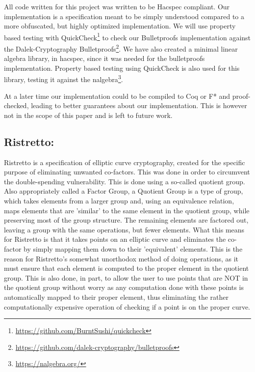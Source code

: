 \documentclass{article}
\begin{document}
All code written for this project was written to be Hacspec
compliant.  Our implementation is a specification meant to
be simply understood compared to a more obfuscated, but highly
optimized implementation. We will use property based testing with
QuickCheck\footnote{\url{https://github.com/BurntSushi/quickcheck}}
to check our Bulletproofs implementation against the Dalek-Cryptography
Bulletproofs\footnote{\url{https://github.com/dalek-cryptography/bulletproofs}}.
We have also created a minimal linear algebra library, in hacspec,
since it was needed for the bulletproofs implementation. Property
based testing using QuickCheck is also used for this library, testing
it against the nalgebra\footnote{\url{https://nalgebra.org/}}.

At a later time our implementation could to be compiled to Coq or F* and
proof-checked, leading to better guarantees about our implementation.
This is however not in the scope of this paper and is left to future
work. %

\subsection{Ristretto:} \label{ristretto}

Ristretto is a specification of elliptic curve cryptography, created for
the specific purpose of eliminating unwanted co-factors. This was done
in order to circumvent the double-spending vulnerability. This is done
using a so-called quotient group. Also appropriately called a Factor
Group, a Quotient Group is a type of group, which takes elements from a
larger group and, using an equivalence relation, maps elements that are
'similar' to the same element in the quotient group, while preserving
most of the group structure. The remaining elements are factored out,
leaving a group with the same operations, but fewer elements. What
this means for Ristretto is that it takes points on an elliptic curve
and eliminates the co-factor by simply mapping them down to their
'equivalent' elements. This is the reason for Ristretto's somewhat
unorthodox method of doing operations, as it must ensure that each
element is computed to the proper element in the quotient group. This is
also done, in part, to allow the user to use points that are NOT in the
quotient group without worry as any computation done with these points
is automatically mapped to their proper element, thus eliminating the
rather computationally expensive operation of checking if a point is
on the proper curve.
\end{document}
